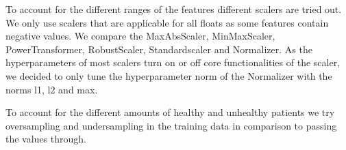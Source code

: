 To account for the different ranges of the features different scalers are tried out. We only use scalers that are applicable for all floats as some features contain negative values.
We compare the MaxAbsScaler, MinMaxScaler, PowerTransformer, RobustScaler, Standardscaler and Normalizer. As the hyperparameters of most scalers turn on or off core functionalities of the scaler, we decided to only tune the hyperparameter norm of the Normalizer with the norms l1, l2 and max.

To account for the different amounts of healthy and unhealthy patients we try oversampling and undersampling in the training data in comparison to passing the values through.


